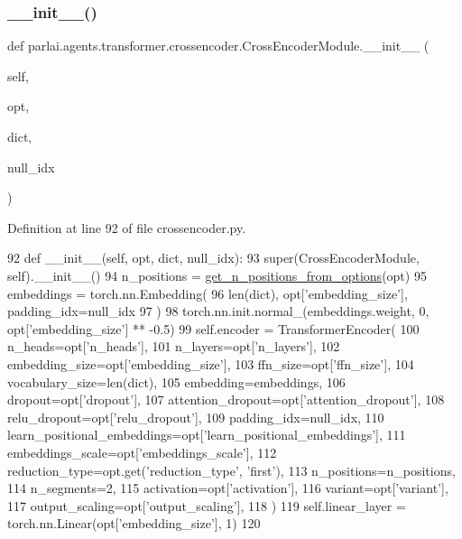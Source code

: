 \subsubsection{\texorpdfstring{\+\_\+\+\_\+init\+\_\+\+\_\+()}{\_\_init\_\_()}}
{\footnotesize\ttfamily def parlai.\+agents.\+transformer.\+crossencoder.\+Cross\+Encoder\+Module.\+\_\+\+\_\+init\+\_\+\+\_\+ (\begin{DoxyParamCaption}\item[{}]{self,  }\item[{}]{opt,  }\item[{}]{dict,  }\item[{}]{null\+\_\+idx }\end{DoxyParamCaption})}



Definition at line 92 of file crossencoder.\+py.


\begin{DoxyCode}
92     \textcolor{keyword}{def }\_\_init\_\_(self, opt, dict, null\_idx):
93         super(CrossEncoderModule, self).\_\_init\_\_()
94         n\_positions = \hyperlink{namespaceparlai_1_1agents_1_1transformer_1_1modules_ab67607512c597ddd54f2b60a1a1eaf4c}{get\_n\_positions\_from\_options}(opt)
95         embeddings = torch.nn.Embedding(
96             len(dict), opt[\textcolor{stringliteral}{'embedding\_size'}], padding\_idx=null\_idx
97         )
98         torch.nn.init.normal\_(embeddings.weight, 0, opt[\textcolor{stringliteral}{'embedding\_size'}] ** -0.5)
99         self.encoder = TransformerEncoder(
100             n\_heads=opt[\textcolor{stringliteral}{'n\_heads'}],
101             n\_layers=opt[\textcolor{stringliteral}{'n\_layers'}],
102             embedding\_size=opt[\textcolor{stringliteral}{'embedding\_size'}],
103             ffn\_size=opt[\textcolor{stringliteral}{'ffn\_size'}],
104             vocabulary\_size=len(dict),
105             embedding=embeddings,
106             dropout=opt[\textcolor{stringliteral}{'dropout'}],
107             attention\_dropout=opt[\textcolor{stringliteral}{'attention\_dropout'}],
108             relu\_dropout=opt[\textcolor{stringliteral}{'relu\_dropout'}],
109             padding\_idx=null\_idx,
110             learn\_positional\_embeddings=opt[\textcolor{stringliteral}{'learn\_positional\_embeddings'}],
111             embeddings\_scale=opt[\textcolor{stringliteral}{'embeddings\_scale'}],
112             reduction\_type=opt.get(\textcolor{stringliteral}{'reduction\_type'}, \textcolor{stringliteral}{'first'}),
113             n\_positions=n\_positions,
114             n\_segments=2,
115             activation=opt[\textcolor{stringliteral}{'activation'}],
116             variant=opt[\textcolor{stringliteral}{'variant'}],
117             output\_scaling=opt[\textcolor{stringliteral}{'output\_scaling'}],
118         )
119         self.linear\_layer = torch.nn.Linear(opt[\textcolor{stringliteral}{'embedding\_size'}], 1)
120 
\end{DoxyCode}


